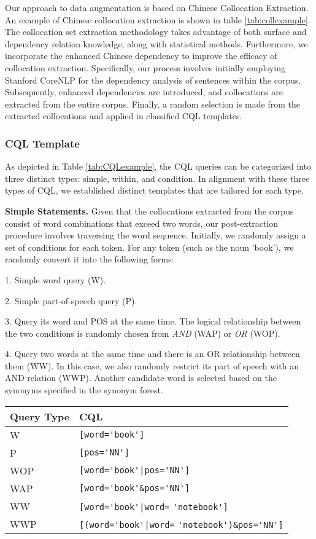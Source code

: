 \documentclass[11pt]{article}
\begin{document}
\begin{CJK*}{UTF8}{gbsn}
Our approach to data augmentation is based on Chinese Collocation Extraction\citep{hucollocation}. An example of Chinese collocation extraction is shown in table \ref{tab:collexample}. The collocation set extraction methodology takes advantage of both surface and dependency relation knowledge, along with statistical methods. Furthermore, we incorporate the enhanced Chinese dependency\citep{yujingsi} to improve the efficacy of collocation extraction. Specifically, our process involves initially employing Stanford CoreNLP\citep{corenlp} for the dependency analysis of sentences within the corpus. Subsequently, enhanced dependencies are introduced, and collocations are extracted from the entire corpus. Finally, a random selection is made from the extracted collocations and applied in classified CQL templates.



\subsubsection{CQL Template}
As depicted in Table \ref{tab:CQLexample}, the CQL queries can be categorized into three distinct types: simple, within, and condition. In alignment with these three types of CQL, we established distinct templates that are tailored for each type.

\textbf{Simple Statements. }
Given that the collocations extracted from the corpus consist of word combinations that exceed two words, our post-extraction procedure involves traversing the word sequence.
Initially, we randomly assign a set of conditions for each token. For any token (such as the noun 'book'), we randomly convert it into the following forms:

1. Simple word query (W).

2. Simple part-of-speech query (P).

3. Query its word and POS at the same time. The logical relationship between the two conditions is randomly chosen from \emph{AND} (WAP) or \emph{OR} (WOP).

4. Query two words at the same time and there is an OR relationship between them (WW). In this case, we also randomly restrict its part of speech with an AND relation (WWP). Another candidate word is selected based on the synonyms specified in the synonym forest.
\begin{table}
    \centering
    \begin{tabular}{p{5em}p{12em}} 
    \hline
    \textbf{Query Type} & \textbf{CQL} \\
    \hline
    W& \verb|[word='book']| \\
    P& \verb|[pos='NN']|\\
    WOP& \verb^[word='book'|pos='NN']^\\
    WAP& \verb^[word='book'&pos='NN']^\\
    WW& \verb^[word='book'|word=^ \verb^'notebook']^\\
    WWP& \verb^[(word='book'|word=^ \verb^'notebook')&pos='NN']^\\


\end{tabular}
\end{table}
\end{CJK*}
\end{document}
